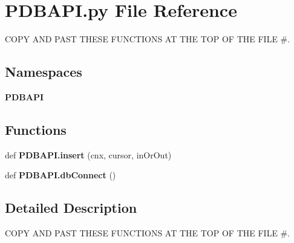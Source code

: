\section{P\+D\+B\+A\+P\+I.\+py File Reference}
\label{_p_d_b_a_p_i_8py}


C\+O\+PY A\+ND P\+A\+ST T\+H\+E\+SE F\+U\+N\+C\+T\+I\+O\+NS AT T\+HE T\+OP OF T\+HE F\+I\+LE \#.  


\subsection*{Namespaces}
\begin{DoxyCompactItemize}
\item 
 {\bf P\+D\+B\+A\+PI}
\end{DoxyCompactItemize}
\subsection*{Functions}
\begin{DoxyCompactItemize}
\item 
def {\bf P\+D\+B\+A\+P\+I.\+insert} (cnx, cursor, in\+Or\+Out)
\item 
def {\bf P\+D\+B\+A\+P\+I.\+db\+Connect} ()
\end{DoxyCompactItemize}


\subsection{Detailed Description}
C\+O\+PY A\+ND P\+A\+ST T\+H\+E\+SE F\+U\+N\+C\+T\+I\+O\+NS AT T\+HE T\+OP OF T\+HE F\+I\+LE \#. 

